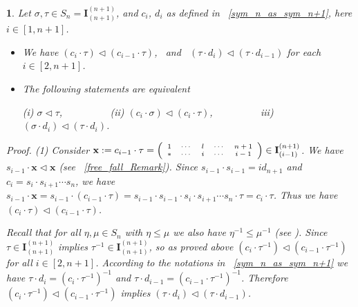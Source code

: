 \documentclass[a4 paper,12pt]{article}
\newcommand{\sma}{\triangleleft}
\DeclareMathOperator{\Bruh}{\leqslant}
\newtheorem{subnum}{}[numeris]
\begin{document}
\begin{subnum}  \textit{Let  $\sigma, \tau \in  S_n=\textbf{I}_{(n+1)}^{(n+1)}$, and  $c_i$,  $d_i$  as defined in ~\ref{sym_n_as_sym_n+1}, here  $i\in \left[1,n+1\right]$. }
\begin{itemize}
\item[(1)] \textit{ We have 
$ \left(c_{i}\cdot  \tau \right)\sma \left(c_{i-1}\cdot  \tau \right) $, \   and \  
	  $ \left(\tau \cdot  d_{i}\right)\sma \left(\tau  \cdot  d_{i-1}\right) $ for each  $i\in \left[2,n+1\right]$.}
	\item[(2)]  \textit{The following statements are equivalent}
\begin{center}
(i) $ \sigma \sma \tau$, \  \  \  \  \  \   \  \  \ 
	(ii)  $\left(c_{i}\cdot  \sigma\right) \sma \left(c_{i}\cdot  \tau\right)$, \  \  \  \  \  \  \  \  \ 
	iii)  $ \left(\sigma \cdot  d_{i}\right)\sma \left(\tau \cdot  d_{i}\right)$.
\end{center}
\end{itemize}


\textit{Proof.} (1) Consider $\textbf{x}:=c_{i-1}\cdot  \tau = \begin{scriptsize} \left(
\begin{array}{ccccc}
1 & \cdots  & l &  \cdots & n+1\\
	\ast & \cdots & i & \cdots & i-1 
\end{array}\right)
  \end{scriptsize} \in \textbf{I}_{(i-1)}^{(n+1)}$. We have  $s_{i-1} \cdot  \textbf{x} \sma \textbf{x}$ (see ~\ref{free_fall_Remark}).
	Since $s_{i-1}\cdot s_{i-1} = id_{n+1}$ and $c_i=s_{i}\cdot s_{i+1}\cdots s_n$, we have 
	$s_{i-1}\cdot  \textbf{x} = s_{i-1}\cdot  \left(c_{i-1}\cdot  \tau\right) = s_{i-1}\cdot  s_{i-1}\cdot s_{i}\cdot s_{i+1}\cdots s_n\cdot \tau  = c_{i}\cdot  \tau $. Thus 
 we have $ \left(c_{i}\cdot  \tau \right)\sma \left(c_{i-1}\cdot  \tau \right) $. 
	
	Recall that for all $\eta, \mu \in S_n$ with $\eta\Bruh \mu$ we also have $\eta^{-1}\Bruh \mu^{-1}$ (see \cite{Humph}). 
	Since $\tau\in \textbf{I}_{(n+1)}^{(n+1)}$ implies $\tau^{-1}\in \textbf{I}_{(n+1)}^{(n+1)}$, so as proved above  $ \left(c_{i}\cdot  \tau^{-1} \right)\sma \left(c_{i-1}\cdot  \tau^{-1} \right) $ for all $i\in \left[2,n+1\right]$. 
 According to the notations in  ~\ref{sym_n_as_sym_n+1} we have $\tau \cdot  d_{i} = \left(c_{i}\cdot  \tau^{-1} \right)^{-1} $ and $\tau \cdot  d_{i-1} = \left(c_{i-1}\cdot  \tau^{-1} \right)^{-1}$. Therefore 	$ \left(c_{i}\cdot  \tau^{-1} \right)\sma \left(c_{i-1}\cdot  \tau^{-1} \right) $  implies $  \left(\tau \cdot  d_{i}\right)\sma \left(\tau  \cdot  d_{i-1}\right)$.
	

\end{subnum}
\end{document}
